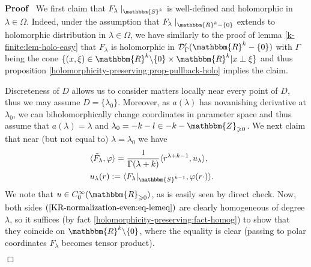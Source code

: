 \documentclass[12pt]{article}
\newcommand{\assign}{:=}
\renewenvironment{proof}{\noindent\textbf{Proof\ }}{\hspace*{\fill}$\Box$\medskip}
\theoremstyle{remark}
\begin{document}
\begin{proof}
  We first claim that $F_{\lambda} \mid_{\mathbbm{S}^k}$ is well-defined
  and holomorphic in $\lambda \in \Omega$. Indeed, under the assumption that
  $F_{\lambda} \mid_{\mathbbm{R}^k - \{ 0 \}}$ extends to holomorphic
  distribution in $\lambda \in \Omega$, we have similarly to the proof of
  lemma \ref{k-finite:lem-holo-easy} that $F_{\lambda}$ is holomorphic in
  $\mathcal{D}'_{\Gamma} (\mathbbm{R}^k - \{ 0 \})$ with $\Gamma$ being the
  cone $\{ (x, \xi) \in \mathbbm{R}^k \backslash \{ 0 \} \times \mathbbm{R}^k
  | x \perp \xi \}$ and thus proposition
  \ref{holomorphicity-preserving:prop-pullback-holo} implies the claim.
  
  Discreteness of $D$ allows us to consider matters locally near every point
  of $D$, thus we may assume $D = \{ \lambda_0 \}$. Moreover, as $a (\lambda)$
  has novanishing derivative at $\lambda_0$, we can biholomorphically change
  coordinates in parameter space and thus assume that $a (\lambda) = \lambda$
  and $\lambda_0 = - k - l \in - k -\mathbbm{Z}_{\geqslant 0}$. We next claim
  that near (but not equal to) $\lambda = \lambda_0$ we have
  \begin{eqnarray}
    & \langle \tilde{F}_{\lambda}, \varphi \rangle = \frac{1}{\Gamma (\lambda
    + k)} \langle r^{\lambda + k - 1}, u_{\lambda} \rangle, 
    \label{KR-normalization-even:eq-lemeq} & \\
    & u_{\lambda} (r) \assign \langle F_{\lambda} |_{\mathbbm{S}^{k - 1}},
    \varphi (r \cdot) \rangle . &  \nonumber
  \end{eqnarray}
  We note that $u \in C^{\infty}_0 (\mathbbm{R}_{\geqslant 0})$, as is easily
  seen by direct check. Now, both sides
  $(\ref{KR-normalization-even:eq-lemeq})$ are clearly homogeneous of degree
  $\lambda$, so it suffices (by fact
  \ref{holomorphicity-preserving:fact-homog}) to show that they coincide on
  $\mathbbm{R}^k \backslash \{ 0 \}$, where the equality is clear (passing to
  polar coordinates $F_{\lambda}$ becomes tensor product).
  

\end{proof}
\end{document}
